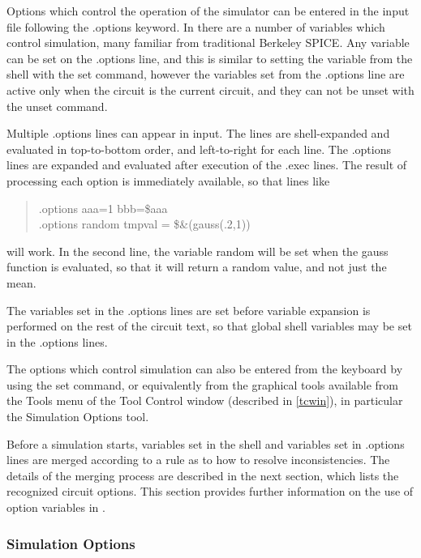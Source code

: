 Options which control the operation of the simulator can be entered in
the {\WRspice} input file following the {\vt .options} keyword.  In
{\WRspice} there are a number of variables which control simulation,
many familiar from traditional Berkeley SPICE.  Any variable can be
set on the {\vt .options} line, and this is similar to setting the
variable from the shell with the {\cb set} command, however the
variables set from the {\vt .options} line are active only when the
circuit is the current circuit, and they can not be unset with the
{\cb unset} command.

Multiple {\vt .options} lines can appear in input.  The lines are
shell-expanded and evaluated in top-to-bottom order, and left-to-right
for each line.  The {\vt .options} lines are expanded and evaluated
after execution of the {\vt .exec} lines.  The result of processing
each option is immediately available, so that lines like
\begin{quote}\vt
  .options aaa=1 bbb=\$aaa\\
  .options random tmpval = \$\&(gauss(.2,1))
\end{quote}
will work.  In the second line, the variable {\et random} will be set
when the {\vt gauss} function is evaluated, so that it will return a
random value, and not just the mean.

The variables set in the {\vt .options} lines are set before variable
expansion is performed on the rest of the circuit text, so that global
shell variables may be set in the {\vt .options} lines.

The options which control simulation can also be entered from the
keyboard by using the {\WRspice} {\cb set} command, or equivalently
from the graphical tools available from the {\cb Tools} menu of the
{\cb Tool Control} window (described in \ref{tcwin}), in particular
the {\cb Simulation Options} tool.

Before a simulation starts, variables set in the shell and variables
set in {\vt .options} lines are merged according to a rule as to how
to resolve inconsistencies.  The details of the merging process are
described in the next section, which lists the recognized circuit
options.  This section provides further information on the use of
option variables in {\WRspice}.


\subsubsection{Simulation Options}
\label{options}

